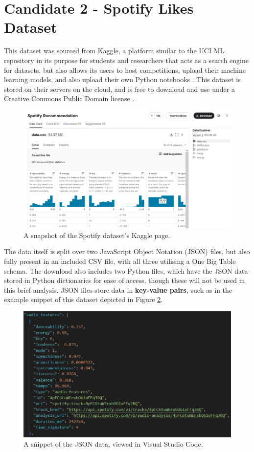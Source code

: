 \documentclass[12pt]{report}
\begin{document}
\pagebreak

\section{Candidate 2 - Spotify Likes Dataset}
This dataset \autocite{vergnou_spotify_nodate} was sourced from \href{https://www.kaggle.com/datasets}{Kaggle}, a platform similar to the UCI ML repository in its 
purpose for students and researchers that acts as a search engine for datasets, but also allows its users to host competitions, upload their machine learning models, and also upload 
their own Python notebooks \autocite{kaggle_kaggle_nodate}. This dataset is stored on their servers on the cloud, and is free to download and use under a 
Creative Commons Public Domain license \autocite{creative_commons_deed_nodate}.

\begin{figure}[H]
    \centering
    \includegraphics[width=.75\linewidth]{Spotify-Kaggle.png}
    \caption{A snapshot of the Spotify dataset's Kaggle page.}
    \label{fig:Spotify-Kaggle}
\end{figure}

The data itself is split over 
two JavaScript Object Notation (JSON) files, but also fully present in an included CSV file, with all three utilising a One Big Table schema. The 
download also includes two Python files, which have the JSON data stored in Python dictionaries for ease of access, though these will not be used in 
this brief analysis. JSON files store data in \textbf{key-value pairs}, such as in the example snippet of this dataset depicted in Figure \ref{fig:spotifySnippet}.  

\begin{figure}[H]
    \centering
    \includegraphics[width=.75\linewidth]{spotifySnippet.png}
    \caption{A snippet of the JSON data, viewed in Visual Studio Code.}
    \label{fig:spotifySnippet}
\end{figure}
\end{document}
